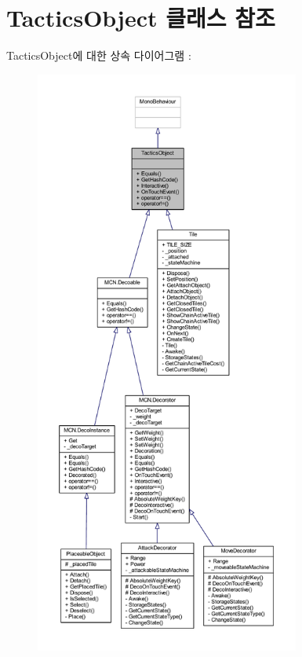 \hypertarget{class_tactics_object}{}\section{Tactics\+Object 클래스 참조}
\label{class_tactics_object}


Tactics\+Object에 대한 상속 다이어그램 \+: 
\nopagebreak
\begin{figure}[H]
\begin{center}
\leavevmode
\includegraphics[height=550pt]{class_tactics_object__inherit__graph}
\end{center}
\end{figure}


